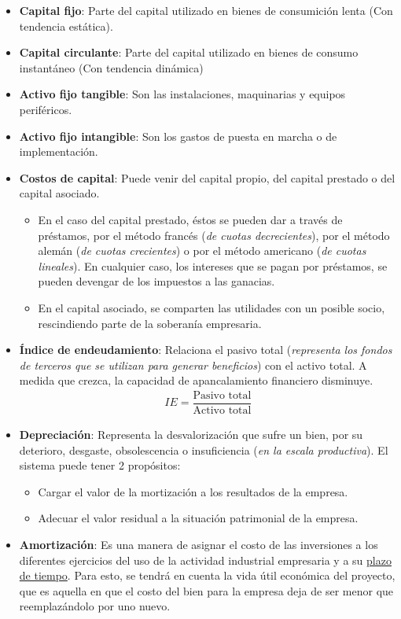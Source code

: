 \documentclass[12pt,a4paper]{article}
\begin{document}
    \begin{itemize}
		\item	\textbf{Capital fijo}: Parte del capital utilizado en bienes de consumición lenta (Con tendencia estática).
        \item	\textbf{Capital circulante}: Parte del capital utilizado en bienes de consumo instantáneo (Con tendencia dinámica)
        \item	\textbf{Activo fijo tangible}: Son las instalaciones, maquinarias y equipos periféricos.
        \item	\textbf{Activo fijo intangible}: Son los gastos de puesta en marcha o de implementación.
        \item	\textbf{Costos de capital}: Puede venir del capital propio, del capital prestado o del capital asociado.
        \begin{itemize}
			\item	En el caso del capital prestado, éstos se pueden dar a través de préstamos, por el método francés (\textsl{de cuotas decrecientes}), por el método alemán (\textsl{de cuotas crecientes}) o por el método americano (\textsl{de cuotas lineales}).
            		En cualquier caso, los intereses que se pagan por préstamos, se pueden devengar de los impuestos a las ganacias.
            \item	En el capital asociado, se comparten las utilidades con un posible socio, rescindiendo parte de la soberanía empresaria.
		\end{itemize}
        \item	\textbf{Índice de endeudamiento}: Relaciona el pasivo total (\textsl{representa los fondos de terceros que se utilizan para generar beneficios}) con el activo total.
        		A medida que crezca, la capacidad de apancalamiento financiero disminuye.
                \begin{align}
                    IE = \dfrac{\text{Pasivo total}}{\text{Activo total}}
                \end{align}
        \item	\textbf{Depreciación}: Representa la desvalorización que sufre un bien, por su deterioro, desgaste, obsolescencia o insuficiencia (\textsl{en la escala productiva}).
        		El sistema puede tener 2 propósitos:
		\begin{itemize}
			\item	Cargar el valor de la mortización a los resultados de la empresa.
            \item	Adecuar el valor residual a la situación patrimonial de la empresa.
		\end{itemize}
        \item	\textbf{Amortización}: Es una manera de asignar el costo de las inversiones a los diferentes ejercicios del uso de la actividad industrial empresaria y a su \underline{plazo de tiempo}.
        		Para esto, se tendrá en cuenta la vida útil económica del proyecto, que es aquella en que el costo del bien para la empresa deja de ser menor que reemplazándolo por uno nuevo.
        		
	\end{itemize}
\end{document}
